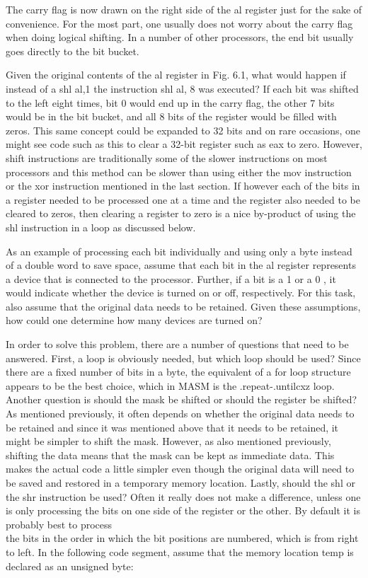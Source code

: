 \documentclass[10pt]{book}
\begin{document}
\begin{center}
The carry flag is now drawn on the right side of the al register just for the sake of convenience. For the most part, one usually does not worry about the carry flag when doing logical shifting. In a number of other processors, the end bit usually goes directly to the bit bucket.

Given the original contents of the al register in Fig. 6.1, what would happen if instead of a shl al,1 the instruction shl al, 8 was executed? If each bit was shifted to the left eight times, bit 0 would end up in the carry flag, the other 7 bits would be in the bit bucket, and all 8 bits of the register would be filled with zeros. This same concept could be expanded to 32 bits and on rare occasions, one might see code such as this to clear a 32-bit register such as eax to zero. However, shift instructions are traditionally some of the slower instructions on most processors and this method can be slower than using either the mov instruction or the xor instruction mentioned in the last section. If however each of the bits in a register needed to be processed one at a time and the register also needed to be cleared to zeros, then clearing a register to zero is a nice by-product of using the shl instruction in a loop as discussed below.

As an example of processing each bit individually and using only a byte instead of a double word to save space, assume that each bit in the al register represents a device that is connected to the processor. Further, if a bit is a 1 or a 0 , it would indicate whether the device is turned on or off, respectively. For this task, also assume that the original data needs to be retained. Given these assumptions, how could one determine how many devices are turned on?

In order to solve this problem, there are a number of questions that need to be answered. First, a loop is obviously needed, but which loop should be used? Since there are a fixed number of bits in a byte, the equivalent of a for loop structure appears to be the best choice, which in MASM is the .repeat-.untilcxz loop. Another question is should the mask be shifted or should the register be shifted? As mentioned previously, it often depends on whether the original data needs to be retained and since it was mentioned above that it needs to be retained, it might be simpler to shift the mask. However, as also mentioned previously, shifting the data means that the mask can be kept as immediate data. This makes the actual code a little simpler even though the original data will need to be saved and restored in a temporary memory location. Lastly, should the shl or the shr instruction be used? Often it really does not make a difference, unless one is only processing the bits on one side of the register or the other. By default it is probably best to process\\
the bits in the order in which the bit positions are numbered, which is from right to left. In the following code segment, assume that the memory location temp is declared as an unsigned byte:


\end{center}
\end{document}

